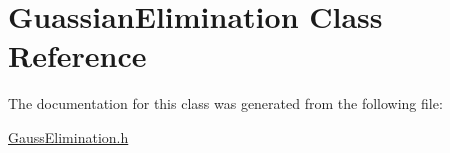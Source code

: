 \hypertarget{class_guassian_elimination}{}\section{Guassian\+Elimination Class Reference}
\label{class_guassian_elimination}


The documentation for this class was generated from the following file\+:\begin{DoxyCompactItemize}
\item 
\mbox{\hyperlink{_gauss_elimination_8h}{Gauss\+Elimination.\+h}}\end{DoxyCompactItemize}
